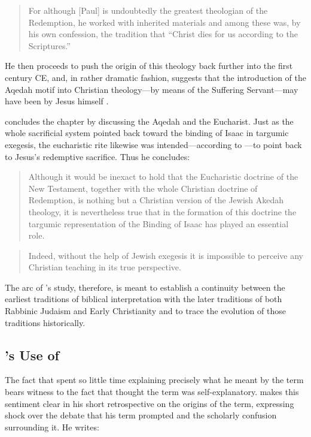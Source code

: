  \begin{quote} For although {[}Paul{]} is undoubtedly the greatest theologian of the Redemption, he worked with inherited materials and among these was, by his own confession, the tradition that ``Christ dies for us according to the Scriptures.''\autocite[221]{vermes1961} \end{quote} 

 He then proceeds to push the origin of this theology back further into the first century CE, and, in rather dramatic fashion, suggests that the introduction of the Aqedah motif into Christian theology---by means of the Suffering Servant---may have been by Jesus himself \autocite[223]{vermes1961}. 

 \vermes concludes the chapter by discussing the Aqedah and the Eucharist. Just as the whole sacrificial system pointed back toward the binding of Isaac in targumic exegesis, the eucharistic rite likewise was intended---according to \vermes---to point back to Jesus's redemptive sacrifice. Thus he concludes: 

 \begin{quote} Although it would be inexact to hold that the Eucharistic doctrine of the New Testament, together with the whole Christian doctrine of Redemption, is nothing but a Christian version of the Jewish Akedah theology, it is nevertheless true that in the formation of this doctrine the targumic representation of the Binding of Isaac has played an essential role. \end{quote} 

 \begin{quote} Indeed, without the help of Jewish exegesis it is impossible to perceive any Christian teaching in its true perspective.\autocite[227]{vermes1961} \end{quote} 

 The arc of \vermes's study, therefore, is meant to establish a continuity between the earliest traditions of biblical interpretation with the later traditions of both Rabbinic Judaism and Early Christianity and to trace the evolution of those traditions historically. 

 \hypertarget{vermess-use-of-rwb}{%
\subsection{\vermes's Use of \RWB}\label{vermess-use-of-rwb}} 

 The fact that \vermes spent so little time explaining precisely what he meant by the term \rwb bears witness to the fact that \vermes thought the term was self-explanatory. \vermes makes this sentiment clear in his short retrospective on the origins of the term, expressing shock over the debate that his term prompted and the scholarly confusion surrounding it. He writes: 

